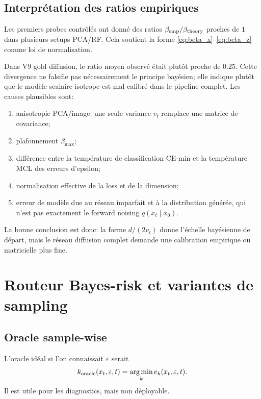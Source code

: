 \documentclass[11pt,a4paper]{article}
\newcommand{\argmin}{\operatorname*{arg\,min}}
\newcommand{\1}{\mathbf{1}}
\newcommand{\eps}{\varepsilon}
\newcommand{\xt}{x_t}
\newcommand{\xzero}{x_0}
\begin{document}
\subsection{Interprétation des ratios empiriques}

Les premiers probes contrôlés ont donné des ratios $\beta_{\rm emp}/\beta_{\rm theory}$ proches de $1$ dans plusieurs setups PCA/RF. Cela soutient la forme \eqref{eq:beta_x}--\eqref{eq:beta_z} comme loi de normalisation.

Dans V9 gold diffusion, le ratio moyen observé était plutôt proche de $0.25$. Cette divergence ne falsifie pas nécessairement le principe bayésien; elle indique plutôt que le modèle scalaire isotrope est mal calibré dans le pipeline complet. Les causes plausibles sont:
\begin{enumerate}[leftmargin=2em]
\item anisotropie PCA/image: une seule variance $v_t$ remplace une matrice de covariance;
\item plafonnement $\beta_{\max}$;
\item différence entre la température de classification CE-min et la température MCL des erreurs d'epsilon;
\item normalisation effective de la loss et de la dimension;
\item erreur de modèle due au réseau imparfait et à la distribution générée, qui n'est pas exactement le forward noising $q(\xt\mid\xzero)$.
\end{enumerate}

La bonne conclusion est donc: la forme $d/(2v_t)$ donne l'échelle bayésienne de départ, mais le réseau diffusion complet demande une calibration empirique ou matricielle plus fine.

\section{Routeur Bayes-risk et variantes de sampling}

\subsection{Oracle sample-wise}

L'oracle idéal si l'on connaissait $\eps$ serait
\begin{equation}
 k_{\rm oracle}(\xt,\eps,t)=\argmin_k e_k(\xt,\eps,t).
\label{eq:sample_oracle}
\end{equation}
Il est utile pour les diagnostics, mais non déployable.
\end{document}
